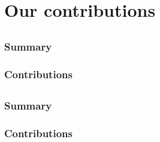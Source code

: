 \documentclass[showtrims,oldfontcommands]{kthesis}
\begin{document}
\chapter{Our contributions}
    \label{chapter:our-contributions}
\renewcommand\thesection{\Alph{section}}
\section{}
\begingroup\centering
\begin{ppBox}
\end{ppBox}
\endgroup

\subsection{Summary}
\subsection{Contributions}

\section{}
\begingroup\centering
\begin{ppBox}
\end{ppBox}
\endgroup

\subsection{Summary}
\subsection{Contributions}

\section{}
\begingroup\centering
\begin{ppBox}
\end{ppBox}
\endgroup
\end{document}
